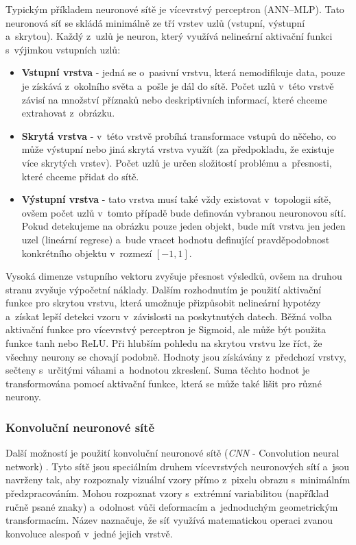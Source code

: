 Typickým příkladem neuronové sítě je vícevrstvý perceptron (ANN--MLP). Tato neuronová síť se skládá minimálně ze tří vrstev uzlů (vstupní, výstupní a~skrytou). Každý z~uzlů je neuron, který využívá nelineární aktivační funkci s~výjimkou vstupních uzlů:
\begin{itemize}
  \item{\textbf{Vstupní vrstva} - jedná se o~pasivní vrstvu, která nemodifikuje data, pouze je získává z~okolního světa a~pošle je dál do sítě. Počet uzlů v~této vrstvě závisí na množství příznaků nebo deskriptivních informací, které chceme extrahovat z~obrázku.}
  \item{\textbf{Skrytá vrstva} - v~této vrstvě probíhá transformace vstupů do něčeho, co může výstupní nebo jiná skrytá vrstva využít (za předpokladu, že existuje více skrytých vrstev). Počet uzlů je určen složitostí problému a~přesnosti, které chceme přidat do sítě.}
  \item{\textbf{Výstupní vrstva} - tato vrstva musí také vždy existovat v~topologii sítě, ovšem počet uzlů v~tomto případě bude definován vybranou neuronovou sítí. Pokud detekujeme na obrázku pouze jeden objekt, bude mít vrstva jen jeden uzel (lineární regrese) a~bude vracet hodnotu definující pravděpodobnost konkrétního objektu v~rozmezí $[-1,1]$.}
\end{itemize}

Vysoká dimenze vstupního vektoru zvyšuje přesnost výsledků, ovšem na druhou stranu zvyšuje výpočetní náklady. Dalším rozhodnutím je použití aktivační funkce pro skrytou vrstvu, která umožnuje přizpůsobit nelineární hypotézy a~získat lepší detekci vzoru v~závislosti na poskytnutých datech. Běžná volba aktivační funkce pro vícevrstvý perceptron je Sigmoid, ale může být použita funkce tanh nebo ReLU. Při hlubším pohledu na skrytou vrstvu lze říct, že všechny neurony se chovají podobně. Hodnoty jsou získávány z~předchozí vrstvy, sečteny s~určitými váhami a~hodnotou zkreslení.
Suma těchto hodnot je transformována pomocí aktivační funkce, která se může také lišit pro různé neurony.


\subsubsection*{Konvoluční neuronové sítě}
Další možností je použití konvoluční neuronové sítě (\textit{CNN} - Convolution neural network) \cite{lenet}. Tyto sítě jsou speciálním druhem vícevrstvých neuronových sítí a~jsou navrženy tak, aby rozpoznaly vizuální vzory přímo z~pixelu obrazu s~minimálním předzpracováním. Mohou rozpoznat vzory s~extrémní variabilitou (například ručně psané znaky) a~odolnost vůči deformacím a~jednoduchým geometrickým transformacím. Název  naznačuje, že síť využívá matematickou operaci zvanou konvoluce alespoň v~jedné jejich vrstvě.

